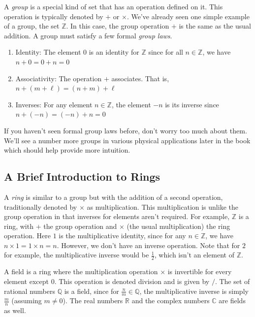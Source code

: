 \documentclass[../book.tex]{subfiles}
\begin{document}
A \textit{group} is a special kind of set that has an operation defined on it. This operation is typically denoted by $+$ or $\times$. We've already seen one simple example of a group, the set $\mathbb{Z}$. In this case, the group operation $+$ is the same as the usual addition. A group must satisfy a few formal \textit{group laws}.
\begin{enumerate}
    \item Identity: The element $0$ is an identity for $\mathbb{Z}$ since for all $n \in \mathbb{Z}$, we have $n + 0 = 0 + n = 0$
    \item Associativity: The operation $+$ associates. That is, $n + (m + \ell) = (n + m) + \ell$
    \item Inverses: For any element $n \in \mathbb{Z}$, the element $-n$ is its inverse since $n + (-n) = (-n) + n = 0$
\end{enumerate}
If you haven't seen formal group laws before, don't worry too much about them. We'll see a number more groups in various physical applications later in the book which should help provide more intuition.


\subsection{A Brief Introduction to Rings}

A \textit{ring} is similar to a group but with the addition of a second operation, traditionally denoted by $\times$ as multiplication. This multiplication is unlike the group operation in that inverses for elements aren't required. For example, $\mathbb{Z}$ is a ring, with $+$ the group operation and $\times$ (the usual multiplication) the ring operation. Here $1$ is the multiplicative identity, since for any $n \in \mathbb{Z}$, we have $n \times 1 = 1 \times n = n$. However, we don't have an inverse operation. Note that for $2$ for example, the multiplicative inverse would be $\frac{1}{2}$, which isn't an element of $\mathbb{Z}$.

A field is a ring where the multiplication operation $\times$ is invertible for every element except $0$. This operation is denoted division and is given by $/$. The set of rational numbers $\mathbb{Q}$ is a field, since for $\frac{n}{m} \in \mathbb{Q}$, the multiplicative inverse is simply $\frac{m}{n}$ (assuming $m \neq 0$). The real numbers $\mathbb{R}$ and the complex numbers $\mathbb{C}$ are fields as well.
\end{document}
